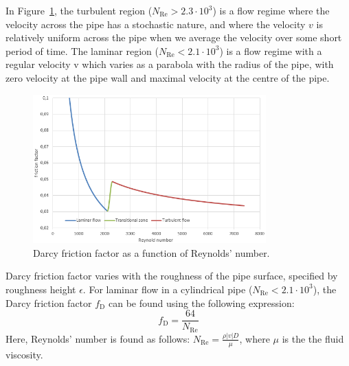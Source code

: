 \documentclass[%
]{USN-PhD}
\begin{document}
In Figure~\ref{fig:fig2}, the turbulent region ($N_\mathrm{Re} > 2.3\cdot10^3$) is a flow regime where the velocity across the pipe has a stochastic nature, and where the velocity $v$ is relatively uniform across the pipe when we average the velocity over some short period of time. The laminar region ($N_\mathrm{Re} < 2.1\cdot10^3$) is a flow regime with a regular velocity v which varies as a parabola with the radius of the pipe, with zero velocity at the pipe wall and maximal velocity at the centre of the pipe.
\begin{figure}[!ht]
  \centering
 \includegraphics[width=0.8\textwidth]{fig/darcyf}
 \caption{Darcy friction factor as a function of Reynolds' number.}
  \label{fig:fig2}
\end{figure}

Darcy friction factor varies with the roughness of the pipe surface, specified by roughness height $\epsilon$. For laminar flow in a cylindrical pipe ($N_\mathrm{Re} < 2.1\cdot10^3$), the Darcy friction factor $f_\mathrm{D}$ can be found using the following expression:
\begin{equation}\label{eq:eq2}
f_\mathrm{D}=\frac{64}{N_\mathrm{Re}}
\end{equation}
Here, Reynolds' number is found as follows: $N_\mathrm{Re}=\frac{\rho|v|D}{\mu}$, where $\mu$ is the the fluid viscosity.
\end{document}
